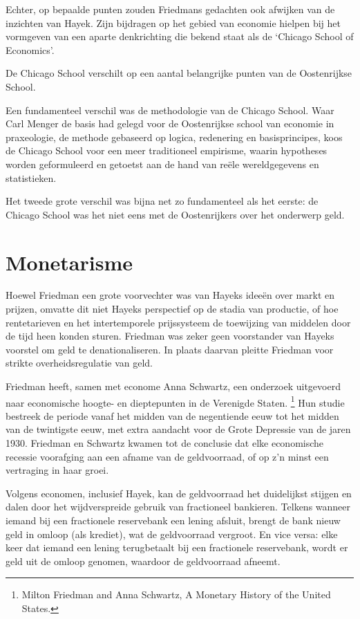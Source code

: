 \documentclass[smalldemyvopaper,11pt,twoside,onecolumn,openright,extrafontsizes,hidelinks]{memoir}
\begin{document}
Echter, op bepaalde punten zouden Friedmans gedachten ook afwijken van
de inzichten van Hayek. Zijn bijdragen op het gebied van economie
hielpen bij het vormgeven van een aparte denkrichting die bekend staat
als de `Chicago School of Economics'.

De Chicago School verschilt op een aantal belangrijke punten van de
Oostenrijkse School.

Een fundamenteel verschil was de methodologie van de Chicago School.
Waar Carl Menger de basis had gelegd voor de Oostenrijkse school van
economie in praxeologie, de methode gebaseerd op logica, redenering en
basisprincipes, koos de Chicago School voor een meer traditioneel
empirisme, waarin hypotheses worden geformuleerd en getoetst aan de hand
van reële wereldgegevens en statistieken.

Het tweede grote verschil was bijna net zo fundamenteel als het eerste:
de Chicago School was het niet eens met de Oostenrijkers over het
onderwerp geld.

\section{Monetarisme}\label{monetarisme}

Hoewel Friedman een grote voorvechter was van Hayeks ideeën over markt
en prijzen, omvatte dit niet Hayeks perspectief op de stadia van
productie, of hoe rentetarieven en het intertemporele prijssysteem de
toewijzing van middelen door de tijd heen konden sturen. Friedman was
zeker geen voorstander van Hayeks voorstel om geld te denationaliseren.
In plaats daarvan pleitte Friedman voor strikte overheidsregulatie van
geld.

Friedman heeft, samen met econome Anna Schwartz, een onderzoek
uitgevoerd naar economische hoogte- en dieptepunten in de Verenigde
Staten. \footnote{Milton Friedman and Anna Schwartz, A Monetary History
  of the United States.} Hun studie bestreek de periode vanaf het midden
van de negentiende eeuw tot het midden van de twintigste eeuw, met extra
aandacht voor de Grote Depressie van de jaren 1930. Friedman en Schwartz
kwamen tot de conclusie dat elke economische recessie voorafging aan een
afname van de geldvoorraad, of op z'n minst een vertraging in haar
groei.

Volgens economen, inclusief Hayek, kan de geldvoorraad het duidelijkst
stijgen en dalen door het wijdverspreide gebruik van fractioneel
bankieren. Telkens wanneer iemand bij een fractionele reservebank een
lening afsluit, brengt de bank nieuw geld in omloop (als krediet), wat
de geldvoorraad vergroot. En vice versa: elke keer dat iemand een lening
terugbetaalt bij een fractionele reservebank, wordt er geld uit de
omloop genomen, waardoor de geldvoorraad afneemt.
\end{document}
